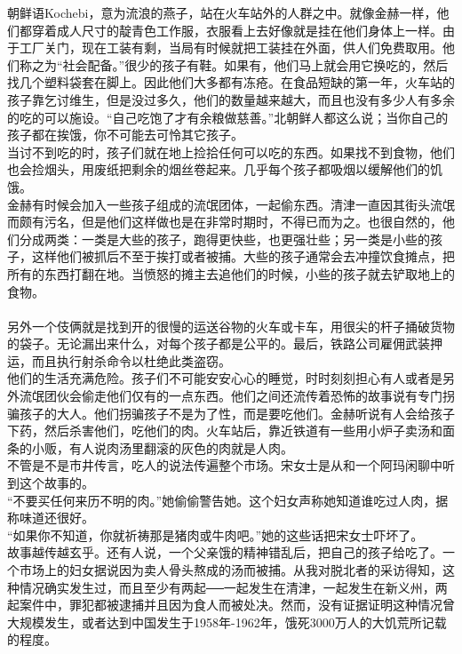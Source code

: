 朝鲜语Kochebi，意为流浪的燕子，站在火车站外的人群之中。就像金赫一样，他们都穿着成人尺寸的靛青色工作服，衣服看上去好像就是挂在他们身体上一样。由于工厂关门，现在工装有剩，当局有时候就把工装挂在外面，供人们免费取用。他们称之为“社会配备。”很少的孩子有鞋。如果有，他们马上就会用它换吃的，然后找几个塑料袋套在脚上。因此他们大多都有冻疮。在食品短缺的第一年，火车站的孩子靠乞讨维生，但是没过多久，他们的数量越来越大，而且也没有多少人有多余的吃的可以施设。“自己吃饱了才有余粮做慈善。”北朝鲜人都这么说；当你自己的孩子都在挨饿，你不可能去可怜其它孩子。\\

当讨不到吃的时，孩子们就在地上捡拾任何可以吃的东西。如果找不到食物，他们也会捡烟头，用废纸把剩余的烟丝卷起来。几乎每个孩子都吸烟以缓解他们的饥饿。\\

金赫有时候会加入一些孩子组成的流氓团体，一起偷东西。清津一直因其街头流氓而颇有污名，但是他们这样做也是在非常时期时，不得已而为之。也很自然的，他们分成两类：一类是大些的孩子，跑得更快些，也更强壮些；另一类是小些的孩子，这样他们被抓后不至于挨打或者被捕。大些的孩子通常会去冲撞饮食摊点，把所有的东西打翻在地。当愤怒的摊主去追他们的时候，小些的孩子就去铲取地上的食物。\\
\\

另外一个伎俩就是找到开的很慢的运送谷物的火车或卡车，用很尖的杆子捅破货物的袋子。无论漏出来什么，对每个孩子都是公平的。最后，铁路公司雇佣武装押运，而且执行射杀命令以杜绝此类盗窃。\\

他们的生活充满危险。孩子们不可能安安心心的睡觉，时时刻刻担心有人或者是另外流氓团伙会偷走他们仅有的一点东西。他们之间还流传着恐怖的故事说有专门拐骗孩子的大人。他们拐骗孩子不是为了性，而是要吃他们。金赫听说有人会给孩子下药，然后杀害他们，吃他们的肉。火车站后，靠近铁道有一些用小炉子卖汤和面条的小贩，有人说肉汤里翻滚的灰色的肉就是人肉。\\

不管是不是市井传言，吃人的说法传遍整个市场。宋女士是从和一个阿玛闲聊中听到这个故事的。\\

“不要买任何来历不明的肉。”她偷偷警告她。这个妇女声称她知道谁吃过人肉，据称味道还很好。\\

“如果你不知道，你就祈祷那是猪肉或牛肉吧。”她的这些话把宋女士吓坏了。\\

故事越传越玄乎。还有人说，一个父亲饿的精神错乱后，把自己的孩子给吃了。一个市场上的妇女据说因为卖人骨头熬成的汤而被捕。从我对脱北者的采访得知，这种情况确实发生过，而且至少有两起──一起发生在清津，一起发生在新义州，两起案件中，罪犯都被逮捕并且因为食人而被处决。然而，没有证据证明这种情况曾大规模发生，或者达到中国发生于1958年-1962年，饿死3000万人的大饥荒所记载的程度。\\


